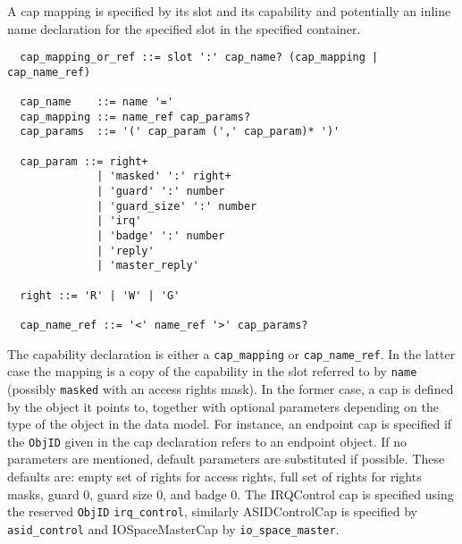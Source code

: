 \documentclass[a4paper,12pt]{article}
\begin{document}
A cap mapping is specified by its slot and its capability and potentially an inline name declaration for the specified slot in the specified container. 

\begin{verbatim}
  cap_mapping_or_ref ::= slot ':' cap_name? (cap_mapping | cap_name_ref)

  cap_name    ::= name '='
  cap_mapping ::= name_ref cap_params?
  cap_params  ::= '(' cap_param (',' cap_param)* ')' 

  cap_param ::= right+
              | 'masked' ':' right+
              | 'guard' ':' number
              | 'guard_size' ':' number
              | 'irq'
              | 'badge' ':' number
              | 'reply'
              | 'master_reply'

  right ::= 'R' | 'W' | 'G'

  cap_name_ref ::= '<' name_ref '>' cap_params?
\end{verbatim}

The capability declaration is either a \texttt{cap\_mapping} or 
\texttt{cap\_name\_ref}. In the latter case the mapping is a copy of the 
capability in the slot referred to by \texttt{name} (possibly \texttt{masked} 
with an access rights mask). In the former case, a cap is defined by the object 
it points to, together with optional parameters depending on the type of the 
object in the data model. For instance, an endpoint cap is specified if the 
\texttt{ObjID} given in the cap declaration refers to an endpoint object. If no 
parameters are mentioned, default parameters are substituted if possible. These 
defaults are: empty set of rights for access rights, full set of rights for 
rights masks, guard 0, guard size 0, and badge 0. The IRQControl cap is 
specified using the reserved \texttt{ObjID} \texttt{irq\_control}, similarly 
ASIDControlCap is specified by \texttt{asid\_control} and IOSpaceMasterCap by 
\texttt{io\_space\_master}.

\end{document}

